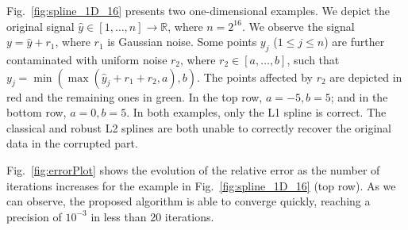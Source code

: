 \documentclass[preprint]{imsart}
\newcommand{\Real}{{\mathbb R}}
\begin{document}
Fig.~\ref{fig:spline_1D_16} presents two one-dimensional examples. We depict the original signal $\hat{y} \in [1, \dots, n] \rightarrow \Real$, where $n=2^{16}$. We observe the signal $y = \hat{y} + r_1$, where $r_1$ is Gaussian noise.
Some points $y_j$ ($1 \leq j \leq n$) are further contaminated with uniform noise $r_2$, where $r_2 \in [ a, \dots, b ]$, such that $y_j = \min (\max (\hat{y}_j + r_1 + r_2, a), b)$. The points affected by $r_2$ are depicted in red and the remaining ones in green.
In the top row, $a = -5, b = 5$; and in the bottom row, $a = 0, b = 5$. In both examples, only the L1 spline is correct. The classical and robust L2 splines are both unable to correctly recover the original data in the corrupted part.

\begin{figure*}
    \centerline{
        \hfill
        \hfill
        \hfill
        \hfill
    }
    \caption{Noisy data (in green) further contaminated with uniform noise (in red). The spline $\hat{y}$, depicted in blue, is obtained using different fitting terms. The proposed method with the L1 fitting term recovers the correct shape.}
    \label{fig:spline_1D_16}
\end{figure*}

Fig.~\ref{fig:errorPlot} shows the evolution of the relative error as the number of iterations increases for the example in Fig.~\ref{fig:spline_1D_16} (top row).
As we can observe, the proposed algorithm is able to converge quickly, reaching a precision of $10^{-3}$ in less than 20 iterations.
\end{document}
